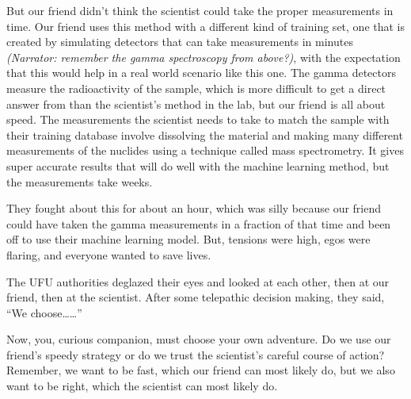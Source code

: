 {\begin{shadequote}
  But our friend didn't think the scientist could take the proper measurements
  in time. Our friend uses this method with a different kind of training set,
  one that is created by simulating detectors that can take measurements in
  minutes \textit{(Narrator: remember the gamma spectroscopy from above?)},
  with the expectation that this would help in a real world scenario like this
  one. The gamma detectors measure the radioactivity of the sample, which is
  more difficult to get a direct answer from than the scientist's method in the
  lab, but our friend is all about speed. The measurements the scientist needs
  to take to match the sample with their training database involve dissolving
  the material and making many different measurements of the nuclides using a
  technique called mass spectrometry\footnotemark[7].  It gives super accurate
  results that will do well with the machine learning method, but the
  measurements take weeks. 
  
  They fought about this for about an hour, which was silly because our friend
  could have taken the gamma measurements in a fraction of that time and been
  off to use their machine learning model. But, tensions were high, egos were
  flaring, and everyone wanted to save lives. 
  
  The UFU authorities deglazed their eyes and looked at each other, then at our
  friend, then at the scientist. After some telepathic decision making, they
  said, ``We choose\ldots\ldots''\\

\end{shadequote}

\narr Now, you, curious companion, must choose your own adventure. Do we use
our friend's speedy strategy or do we trust the scientist's careful course of
action? Remember, we want to be fast, which our friend can most likely do, but
we also want to be right, which the scientist can most likely do.

}
